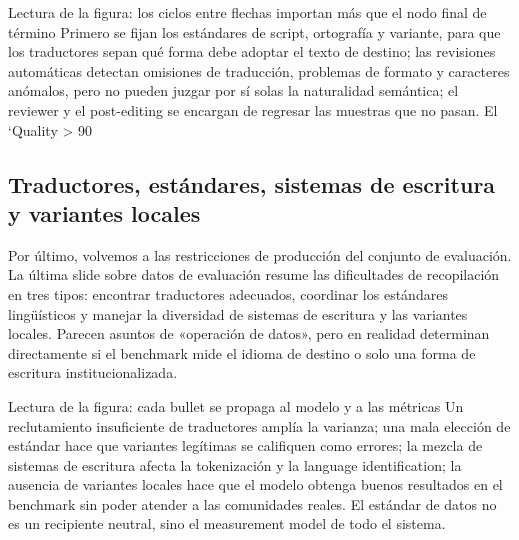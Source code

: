 \begin{knowledgebox}{Lectura de la figura: los ciclos entre flechas importan más que el nodo final de término}
Primero se fijan los estándares de script, ortografía y variante, para que los traductores sepan qué forma debe adoptar el texto de destino; las revisiones automáticas detectan omisiones de traducción, problemas de formato y caracteres anómalos, pero no pueden juzgar por sí solas la naturalidad semántica; el reviewer y el post-editing se encargan de regresar las muestras que no pasan. El `Quality > 90%
\end{knowledgebox}


\subsection{Traductores, estándares, sistemas de escritura y variantes locales}

Por último, volvemos a las restricciones de producción del conjunto de evaluación. La última slide sobre datos de evaluación resume las dificultades de recopilación en tres tipos: encontrar traductores adecuados, coordinar los estándares lingüísticos y manejar la diversidad de sistemas de escritura y las variantes locales. Parecen asuntos de «operación de datos», pero en realidad determinan directamente si el benchmark mide el idioma de destino o solo una forma de escritura institucionalizada.


\begin{knowledgebox}{Lectura de la figura: cada bullet se propaga al modelo y a las métricas}
Un reclutamiento insuficiente de traductores amplía la varianza; una mala elección de estándar hace que variantes legítimas se califiquen como errores; la mezcla de sistemas de escritura afecta la tokenización y la language identification; la ausencia de variantes locales hace que el modelo obtenga buenos resultados en el benchmark sin poder atender a las comunidades reales. El estándar de datos no es un recipiente neutral, sino el measurement model de todo el sistema.
\end{knowledgebox}

